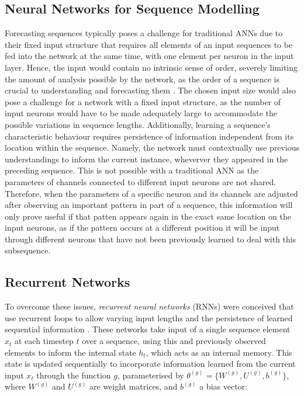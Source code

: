 \documentclass[a4paper, 11pt]{report}
\begin{document}
    \subsection{Neural Networks for Sequence Modelling}

    Forecasting sequences typically poses a challenge for traditional ANNs due to their fixed input structure that requires all elements of an input sequences to be fed into the network at the same time, with one element per neuron in the input layer. Hence, the input would contain no intrinsic sense of order, severely limiting the amount of analysis possible by the network, as the order of a sequence is crucial to understanding and forecasting them \citep{tsantekidis-2022}. The chosen input size would also pose a challenge for a network with a fixed input structure, as the number of input neurons would have to be made adequately large to accommodate the possible variations in sequence lengths. Additionally, learning a sequence's characteristic behaviour requires persistence of information independent from its location within the sequence. Namely, the network must contextually use previous understandings to inform the current instance, wheverver they appeared in the preceding sequence. This is not possible with a traditional ANN as the parameters of channels connected to different input neurons are not shared. Therefore, when the parameters of a specific neuron and its channels are adjusted after observing an important pattern in part of a sequence, this information will only prove useful if that patten appears again in the exact same location on the input neurons, as if the pattern occurs at a different position it will be input through different neurons that have not been previously learned to deal with this subsequence.


    \subsection{Recurrent Networks}

    To overcome these issues, \emph{recurrent neural networks} (RNNs) were conceived that use recurrent loops to allow varying input lengths and the persistence of learned sequential information \citep{sharma-2022}. These networks take input of a single sequence element $x_t$ at each timestep $t$ over a sequence, using this and previously observed elements to inform the internal state $h_t$, which acts as an internal memory. This state is updated sequentially to incorporate information learned from the current input $x_t$ through the function $g$, parameterised by $\theta^{(g)} = \{ W^{(g)}, U^{(g)}, b^{(g)} \}$, where $W^{(g)}$ and $U^{(g)}$ are weight matrices, and $b^{(g)}$ a bias vector\citep{sharma-2022}:
\end{document}
